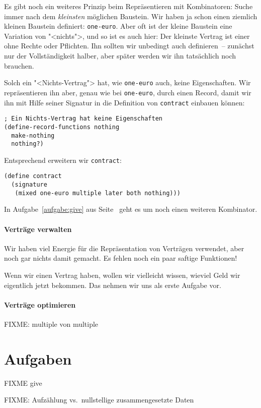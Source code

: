 Es gibt noch ein weiteres Prinzip beim Repräsentieren mit
Kombinatoren: Suche immer nach dem \emph{kleinsten} möglichen
Baustein.  Wir haben ja schon einen ziemlich kleinen Baustein
definiert: \lstinline{one-euro}.  Aber oft ist der kleine Baustein
eine Variation von "<nichts">, und so ist es auch hier: Der kleinste
Vertrag ist einer ohne Rechte oder Pflichten.  Ihn sollten wir
unbedingt auch definieren~-- zunächst nur der Vollständigkeit halber,
aber später werden wir ihn tatsächlich noch brauchen.

Solch ein "<Nichts-Vertrag"> hat, wie \lstinline{one-euro} auch, keine
Eigenschaften.  Wir repräsentieren ihn aber, genau wie bei
\lstinline{one-euro}, durch einen Record, damit wir ihn mit Hilfe
seiner Signatur in die Definition von \lstinline{contract} einbauen
können:
%
\begin{lstlisting}
; Ein Nichts-Vertrag hat keine Eigenschaften
(define-record-functions nothing
  make-nothing
  nothing?)
\end{lstlisting}
%
Entsprechend erweitern wir \lstinline{contract}:
%
\begin{lstlisting}
(define contract
  (signature
   (mixed one-euro multiple later both nothing)))
\end{lstlisting}
%
In Aufgabe~\ref{aufgabe:give} aus Seite~\pageref{aufgabe:give} geht es
um noch einen weiteren Kombinator.

\paragraph{Verträge verwalten}

Wir haben viel Energie für die Repräsentation von Verträgen verwendet,
aber noch gar nichts damit gemacht.  Es fehlen noch ein paar saftige
Funktionen!

Wenn wir einen Vertrag haben, wollen wir vielleicht wissen, wieviel
Geld wir eigentlich jetzt bekommen.  Das nehmen wir uns als erste Aufgabe
vor.



\paragraph{Verträge optimieren}

\begin{aufgabe}
  FIXME: multiple von multiple
\end{aufgabe}

\section*{Aufgaben}

\begin{aufgabe}\label{aufgabe:give}
  FIXME give
\end{aufgabe}

\begin{aufgabe}\label{aufgabe:aufzaehlung-vs-nullstellig}
  FIXME: Aufzählung vs.\ nullstellige zusammengesetzte Daten
\end{aufgabe}




